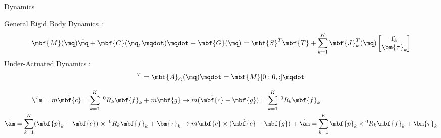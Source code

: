 \begin{frame}{Dynamics}

General Rigid Body Dynamics :
\begin{equation*}
\mbf{M}(\mq) \ddot{\mq}  + \mbf{C}(\mq, \mqdot)\mqdot + \mbf{G}(\mq) = \mbf{S}^T \mbf{T} + \sum\limits_{k=1}^{K} \mbf{J}_k^T(\mq)
\begin{bmatrix}
{\bf f}_k \\
\bm{\tau}_k
\end{bmatrix}
\end{equation*}
%
Under-Actuated Dynamics :
\begin{equation*}
  [{\bf \lm} \;\;\;\; {\bf \am}]^T= \mbf{A}_G (\mq) \mqdot = \mbf{M}[0:6,:] \mqdot
\end{equation*}
\begin{small}
\begin{align*}
\dot{\bf \lm} = m \ddot{\mbf{c}} = \sum\limits_{k=1}^{K} \; {^0}R_k \mbf{f}_k + m \mbf{g} 
&\rightarrow
m (\ddot{\mbf{c}}-\mbf{g}) = \sum\limits_{k=1}^{K} \; {^0}R_k \mbf{f}_k
\\
\dot{\bf \am} = \sum\limits_{k=1}^{K} (\mbf{p}_k -\mbf{c}) \times \; {^0}R_k \mbf{f}_k  + \bm{\tau}_k
&\rightarrow
m \mbf{c} \times (\ddot{\mbf{c}}-\mbf{g}) + \dot{\bf \am} = \sum\limits_{k=1}^{K} \mbf{p}_k \times {^0}R_k \mbf{f}_k  + \bm{\tau}_k
\end{align*}
\end{small}


\end{frame}